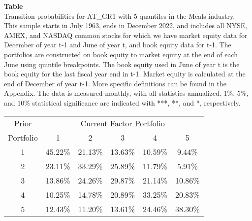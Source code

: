 \begin{table*}[ht!]
\raggedright
{}
\label{tab: transition_probs_AT_GR1_Meals_with_5_quantiles}
\textbf{Table \thetable} \\
Transition probabilities for AT_GR1 with 5 quantiles in the Meals industry. \\
\hspace*{1em}This sample starts in July 1963, ends in December 2022, and includes all NYSE, AMEX, and NASDAQ common stocks for which we have market equity data for December of year t-1 and June of year t, and book equity data for t-1. The portfolios are constructed on book equity to market equity at the end of each June using quintile breakpoints.  The book equity used in June of year t is the book equity for the last fiscal year end in t-1.  Market equity is calculated at the end of December of year t-1.  More specific definitions can be found in the Appendix.  The data is measured monthly, with all statistics annualized.  1\%, 5\%, and 10\% statistical significance are indicated with ***, **, and *, respectively. \\
\vspace{0.5em}
\centering
\begin{adjustbox}{max width=\textwidth}
\begin{tabular}{@{}cccccc@{}}
\toprule
Prior & \multicolumn{5}{c}{Current Factor Portfolio} \\
Portfolio & 1 & 2 & 3 & 4 & 5 \\
\midrule
1 & 45.22\% & 21.13\% & 13.63\% & 10.59\% & 9.44\% \\
2 & 23.11\% & 33.29\% & 25.89\% & 11.79\% & 5.91\% \\
3 & 13.86\% & 24.26\% & 29.87\% & 21.14\% & 10.86\% \\
4 & 10.25\% & 14.78\% & 20.89\% & 33.25\% & 20.83\% \\
5 & 12.43\% & 11.20\% & 13.61\% & 24.46\% & 38.30\% \\
\bottomrule
\end{tabular}
\end{adjustbox}
\end{table*}